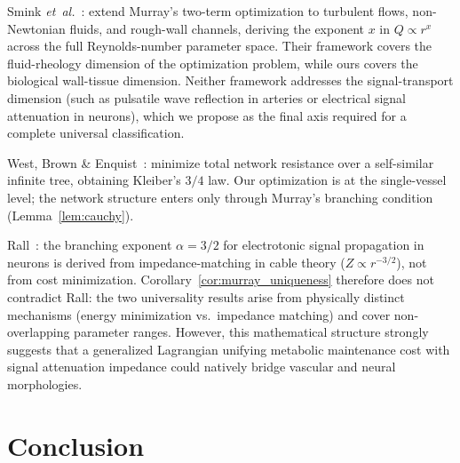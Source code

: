 \documentclass[11pt,a4paper]{article}
\theoremstyle{remark}
\begin{document}
Smink \textit{et~al.}~\cite{Smink2025}: extend Murray's two-term optimization to
turbulent flows, non-Newtonian fluids, and rough-wall channels, deriving the
exponent $x$ in $Q \propto r^x$ across the full Reynolds-number parameter space.
Their framework covers the fluid-rheology dimension of the optimization problem,
while ours covers the biological wall-tissue dimension. Neither framework
addresses the signal-transport dimension (such as pulsatile wave reflection in
arteries or electrical signal attenuation in neurons), which we propose as the
final axis required for a complete universal classification.

West, Brown \& Enquist~\cite{WBE1997}: minimize total network resistance
over a self-similar infinite tree, obtaining Kleiber's $3/4$ law.
Our optimization is at the single-vessel level; the network structure enters
only through Murray's branching condition (Lemma~\ref{lem:cauchy}).

Rall~\cite{Rall1959}: the branching exponent $\alpha=3/2$ for electrotonic
signal propagation in neurons is derived from impedance-matching in cable
theory ($Z\propto r^{-3/2}$), not from cost minimization.
Corollary~\ref{cor:murray_uniqueness} therefore does not contradict Rall: the
two
universality results arise from physically distinct mechanisms
(energy minimization vs.\ impedance matching) and cover non-overlapping
parameter ranges. However, this mathematical structure strongly suggests that a
generalized Lagrangian unifying metabolic maintenance cost with signal
attenuation impedance could natively bridge vascular and neural morphologies.

\section{Conclusion}
\end{document}
